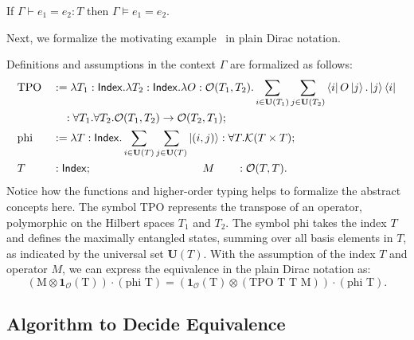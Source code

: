 \begin{lemma}\label{lem: axiom sound}
If \( \Gamma \vdash e_1 = e_2 :T \) then \( \Gamma \vDash e_1 = e_2\).
\end{lemma}
Next, we formalize the motivating example~ in
plain Dirac notation.
\begin{example}
    \label{ex: formalizing motivating}
    Definitions and assumptions in the context \( \Gamma \) are formalized as follows:
    \begin{align*}
        & \text{TPO} && := \lambda T_1 : \mathsf{Index}. \lambda T_2 : \mathsf{Index}. \lambda O : \mathcal{O}(T_1, T_2). \sum_{i \in \mathbf{U}(T_1)} \sum_{j \in \mathbf{U}(T_2)} \bra{i} O \ket{j} . \ket{j}\bra{i} \\
        & &&\quad : \forall T_1. \forall T_2. \mathcal{O}(T_1, T_2) \to \mathcal{O}(T_2, T_1); \\
        &\text{phi} &&:= \lambda T : \mathsf{Index}. \sum_{i \in \mathbf{U}(T)} \sum_{j \in \mathbf{U}(T)} \ket{(i, j)} : \forall T.\mathcal{K}(T \times T); \\
        & T && : \mathsf{Index};  \qquad \qquad \qquad \qquad \qquad M \qquad : \mathcal{O}(T, T).
    \end{align*}
    Notice how the functions and higher-order typing helps to formalize the abstract concepts here.
    The symbol \( \text{TPO} \) represents the transpose of an operator, polymorphic on the Hilbert spaces \( T_1 \) and \( T_2 \). 
    The symbol \( \text{phi} \) takes the index \( T \) and defines the maximally entangled states, summing over all basis elements in \( T \), as indicated by the universal set \( \mathbf{U}(T) \).
    With the assumption of the index \( T \) and operator \( M \), we can express the equivalence in the plain Dirac notation as:
    \[
    (\textrm{M} \otimes \mathbf{1}_\mathcal{O}(\textrm{T})) \cdot (\textrm{phi T}) = (\mathbf{1}_\mathcal{O}(\textrm{T}) \otimes (\textrm{TPO T T M})) \cdot (\textrm{phi T}).
    \]
\end{example}



\subsection{Algorithm to Decide Equivalence}

